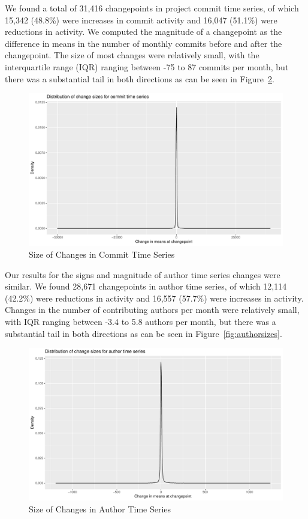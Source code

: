 \documentclass[10pt,conference]{IEEEtran}
\begin{document}
We found a total of 31,416 changepoints in project commit time series, of which 15,342 (48.8\%) were increases in commit activity and 16,047 (51.1\%) were reductions in activity. We computed the magnitude of a changepoint as the difference in means in the number of monthly commits before and after the changepoint. The size of most changes were relatively small, with the interquartile range (IQR) ranging between -75 to 87 commits per month, but there was a substantial tail in both directions as can be seen in Figure~\ref{fig:commitsizes}.
\begin{figure}[ht!]
    \centering
    \includegraphics[width=\linewidth]{commit-changesizes.pdf}
    \caption{Size of Changes in Commit Time Series}
    \label{fig:commitsizes}
\end{figure}

Our results for the signs and magnitude of author time series changes were similar. We found 28,671 changepoints in author time series, of which 12,114 (42.2\%) were reductions in activity and 16,557 (57.7\%) were increases in activity. Changes in the number of contributing authors per month were relatively small, with IQR ranging between -3.4 to 5.8 authors per month, but there was a substantial tail in both directions as can be seen in Figure~\ref{fig:authorsizes}.
\begin{figure}[ht!]
    \centering
    \includegraphics[width=\linewidth]{author-changesizes.pdf}
    \caption{Size of Changes in Author Time Series}
    \label{fig:commitsizes}
\end{figure}
\end{document}
